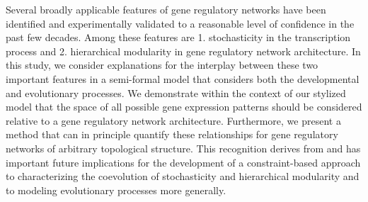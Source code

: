 Several broadly applicable features of gene regulatory networks have been identified and experimentally validated to a reasonable level of confidence in the past few decades. Among these features are 1. stochasticity in the transcription process and 2. hierarchical modularity in gene regulatory network architecture. In this study, we consider explanations for the interplay between these two important features in a semi-formal model that considers both the developmental and evolutionary processes. We demonstrate within the context of our stylized model that the space of all possible gene expression patterns should be considered relative to a gene regulatory network architecture. Furthermore, we present a method that can in principle quantify these relationships for gene regulatory networks of arbitrary topological structure. This recognition derives from and has important future implications for the development of a constraint-based approach to characterizing the coevolution of stochasticity and hierarchical modularity and to modeling evolutionary processes more generally.
